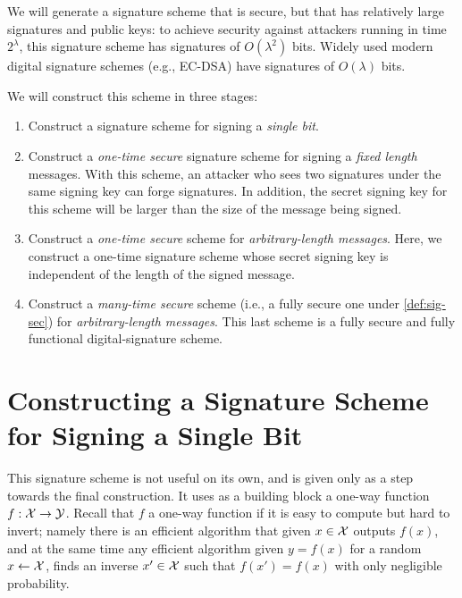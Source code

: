 We will generate a signature scheme that is secure, but that has relatively large
signatures and public keys: to achieve security against attackers running
in time $2^\lambda$, this signature scheme has signatures of $O(\lambda^2)$ bits.
Widely used modern digital signature schemes (e.g., EC-DSA) have signatures
of $O(\lambda)$ bits.

We will construct this scheme in three stages:

\begin{enumerate}
	\item Construct a signature scheme for signing a \emph{single bit}.  

        \item Construct a \emph{one-time secure} signature scheme for signing a \emph{fixed length} messages.
        With this scheme, an attacker who sees two signatures under the same signing key can forge signatures.
        In addition, the secret signing key for this scheme will be larger than the size of the message 
        being signed.
      \item Construct a \emph{one-time secure} scheme for \emph{arbitrary-length messages}.
        Here, we construct a one-time signature scheme whose secret signing key is independent of 
        the length of the signed message.

      \item Construct a \emph{many-time secure} scheme (i.e., a fully secure one under 
        \cref{def:sig-sec}) for \emph{arbitrary-length messages}.
        This last scheme is a fully secure and fully functional digital-signature scheme.
\end{enumerate}

\section{Constructing a Signature Scheme for Signing a Single Bit}

This signature scheme is not useful on its own, and is given only as a step towards the final construction.  It uses as a building block a one-way function $f:\mathcal{X}\rightarrow\mathcal{Y}$.  Recall that $f$ a one-way function if it is easy to compute but hard to invert; namely there is an efficient algorithm that given $x\in\mathcal{X}$ outputs $f(x)$, and at the same time any efficient algorithm given $y=f(x)$ for a random $x\leftarrow \cal X$, finds an inverse $x'\in\mathcal{X}$ such that $f(x')=f(x)$ with only negligible probability.  


